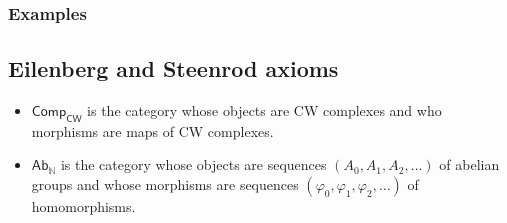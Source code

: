 \documentclass[10pt]{article}
\newcommand{\nn}{\mathbb{N}}
\begin{document}
            \subsubsection{Examples}


        \subsection{Eilenberg and Steenrod axioms}

            \begin{itemize}
                \item $\mathsf{Comp_{CW}}$ is the category whose objects are CW complexes and who morphisms are maps of CW complexes.
                \item $\mathsf{Ab}_\nn$ is the category whose objects are sequences $(A_0,A_1,A_2,\ldots)$ of abelian groups and whose morphisms are sequences $(\varphi_0,\varphi_1,\varphi_2,\ldots)$ of homomorphisms.
            \end{itemize}
\end{document}

